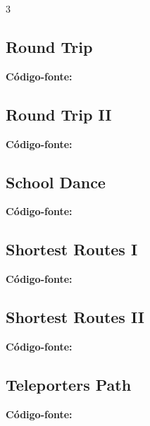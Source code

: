\documentclass[8pt]{extarticle}
\begin{document}
\begin{multicols*}{3}
\subsection{Round Trip}
\begin{caixaenunciado}

\end{caixaenunciado}
\vspace{0.3cm}
\noindent\textbf{Código-fonte:}


\subsection{Round Trip II}
\begin{caixaenunciado}

\end{caixaenunciado}
\vspace{0.3cm}
\noindent\textbf{Código-fonte:}


\subsection{School Dance}
\begin{caixaenunciado}

\end{caixaenunciado}
\vspace{0.3cm}
\noindent\textbf{Código-fonte:}


\subsection{Shortest Routes I}
\begin{caixaenunciado}

\end{caixaenunciado}
\vspace{0.3cm}
\noindent\textbf{Código-fonte:}


\subsection{Shortest Routes II}
\begin{caixaenunciado}

\end{caixaenunciado}
\vspace{0.3cm}
\noindent\textbf{Código-fonte:}


\subsection{Teleporters Path}
\begin{caixaenunciado}

\end{caixaenunciado}
\vspace{0.3cm}
\noindent\textbf{Código-fonte:}

\end{multicols*}
\end{document}

